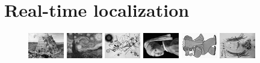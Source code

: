 \documentclass[letterpaper, 10pt, conference]{ieeeconf}
\begin{document}
\section{Real-time localization}

\begin{figure}
\hfill
{}\hfill
{}\hfill
{}\hfill
{}\hfill
{}

\vspace{.6em}

\includegraphics[width=.15\textwidth,interpolate=false]{maps/breugel_babel_A2} \hfill
\includegraphics[width=.15\textwidth,interpolate=false]{maps/van-gogh_starry-night_A2} \hfill
\includegraphics[width=.15\textwidth,interpolate=false]{maps/kandinsky_comp-8_A2} \hfill
\includegraphics[width=.15\textwidth,interpolate=false]{maps/vermeer_girl-pearl_A2} \hfill
\includegraphics[width=.15\textwidth,interpolate=false]{maps/babar_A2} \hfill
\includegraphics[width=.15\textwidth,interpolate=false]{maps/child-drawing_tooth-fairy_A2}

\vspace{.7em}


\end{figure}
\end{document}
